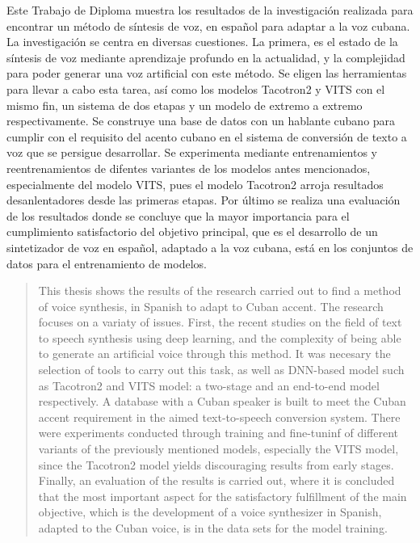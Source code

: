 \begin{resumen}
Este Trabajo de Diploma muestra los resultados de la investigación realizada para encontrar un método de síntesis de voz, en español para adaptar a la voz cubana. La investigación se centra en diversas cuestiones. La primera, es el estado de la síntesis de voz mediante aprendizaje profundo en la actualidad, y la complejidad para poder generar una voz artificial con este método. Se eligen las herramientas para llevar a cabo esta tarea, así como los modelos Tacotron2 y VITS con el mismo fin, un sistema de dos etapas y un modelo de extremo a extremo respectivamente. Se construye una base de datos con un hablante cubano para cumplir con el requisito del acento cubano en el sistema de conversión de texto a voz que se persigue desarrollar. Se experimenta mediante entrenamientos y reentrenamientos de difentes variantes de los modelos antes mencionados, especialmente del modelo VITS, pues el modelo Tacotron2 arroja resultados desanlentadores desde las primeras etapas. Por último se realiza una evaluación de los resultados donde se concluye que la mayor importancia para el cumplimiento satisfactorio del objetivo principal, que es el desarrollo de un sintetizador de voz en español, adaptado a la voz cubana, está en los conjuntos de datos para el entrenamiento de modelos. 
\end{resumen}

\begin{abstract}
	This thesis shows the results of the research carried out to find a method of voice synthesis, in Spanish to adapt to Cuban accent. The research focuses on a variaty of issues. First, the recent studies on the field of text to speech synthesis using deep learning, and the complexity of being able to generate an artificial voice through this method. It was necesary the selection of tools to carry out this task, as well as DNN-based model such as Tacotron2 and VITS model: a two-stage and an end-to-end model respectively. A database with a Cuban speaker is built to meet the Cuban accent requirement in the aimed text-to-speech conversion system. There were experiments conducted through training and fine-tuninf of different variants of the previously mentioned models, especially the VITS model, since the Tacotron2 model yields discouraging results from early stages. Finally, an evaluation of the results is carried out, where it is concluded that the most important aspect for the satisfactory fulfillment of the main objective, which is the development of a voice synthesizer in Spanish, adapted to the Cuban voice, is in the data sets for the model training.
\end{abstract}